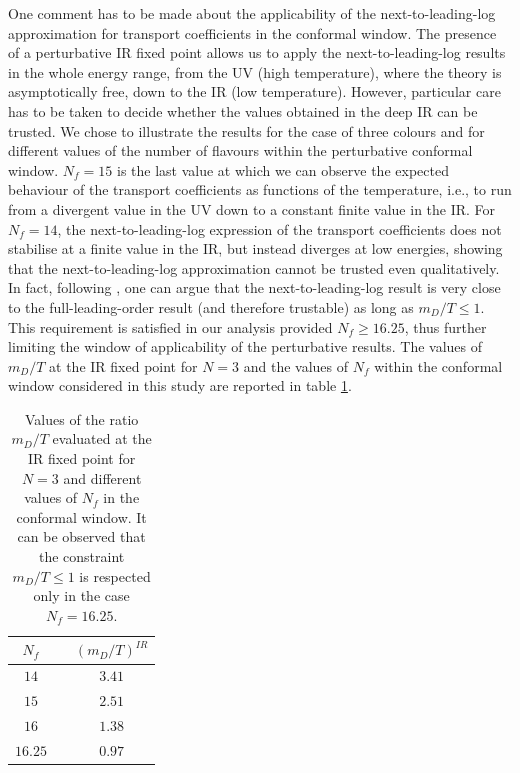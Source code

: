 One comment has to be made about the applicability of the next-to-leading-log approximation for transport coefficients in the conformal window. The presence of a perturbative IR fixed point allows us to apply the next-to-leading-log results in the whole energy range, from the UV (high temperature), where the theory is asymptotically free, down to the IR (low temperature). However, particular care has to be taken to decide whether the values obtained in the deep IR can be trusted. We chose to illustrate the results for the case of three colours and for different values of the number of flavours within the perturbative conformal window. $N_f=15$ is the last value at which we can observe the expected behaviour of the transport coefficients as functions of the temperature, i.e., to run from a divergent value in the UV down to a constant finite value in the IR. For $N_f=14$, the next-to-leading-log expression of the transport coefficients does not stabilise at a finite value in the IR, but instead diverges at low energies, showing that the next-to-leading-log approximation cannot be trusted even qualitatively. In fact, following \cite{Arnold:2003zc}, one can argue that the next-to-leading-log result is very close to the full-leading-order result (and therefore trustable) as long as $m_D/T \leq 1$.  This requirement is satisfied in our analysis provided $N_f \geq 16.25$, thus further limiting the window of applicability of the perturbative results.  The values of $m_D/T$ at the IR fixed point for $N=3$ and the values of $N_f$ within the conformal window considered in this study are reported in table \ref{mDTconstraint}.



   \begin{table}
\begin{center}
        \begin{tabular}{c||c }
    $N_f$ & $ \quad (m_D/T)^{IR}$ \\
    \hline \hline
        $14$ &$\quad 3.41$   \\
        $15$ & $\quad 2.51$ \\
        $16$ & $\quad 1.38$  \\
    $16.25$ & $\quad 0.97$ \\
    \end{tabular}
     \end{center}
\caption{Values of the ratio $m_D/T$ evaluated at the IR fixed point for $N=3$ and different values of $N_f$ in the 
conformal window. It can be observed that the constraint $m_D/T \leq 1$ is respected only in the case $N_f=16.25$.}
\label{mDTconstraint}
    \end{table}

